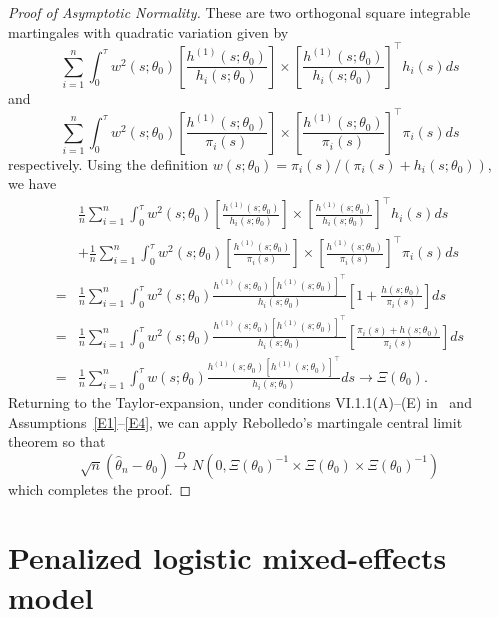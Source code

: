 \documentclass[12pt]{amsart}
\begin{document}
\begin{proof}[Proof of Asymptotic Normality]
These are two orthogonal square integrable martingales with quadratic variation given by
\[
\sum_{i=1}^n \int_0^\tau w^2(s;\theta_0) \left[ \frac{h^{(1)}(s; \theta_0)}{h_i (s;\theta_0)} \right] \times \left[ \frac{h^{(1)} (s;\theta_0)}{h_i (s;\theta_0)} \right]^\top h_i (s) ds
\]
and
\[
\sum_{i=1}^n \int_0^\tau w^2(s;\theta_0) \left[ \frac{h^{(1)}(s; \theta_0)}{\pi_i (s)} \right] \times \left[ \frac{h^{(1)} (s;\theta_0)}{\pi_i (s)} \right]^\top \pi_i (s) ds
\]
respectively.  Using the definition $w(s;\theta_0) = \pi_i(s) / (\pi_i(s)+h_i(s;\theta_0))$, we have
\begin{align*}
&\frac{1}{n} \sum_{i=1}^n \int_0^\tau w^2(s;\theta_0) \left[ \frac{h^{(1)}(s; \theta_0)}{h_i (s;\theta_0)} \right] \times \left[ \frac{h^{(1)} (s;\theta_0)}{h_i (s;\theta_0)} \right]^\top h_i (s) ds \\
&+
\frac{1}{n} \sum_{i=1}^n \int_0^\tau w^2(s;\theta_0) \left[ \frac{h^{(1)}(s; \theta_0)}{\pi_i (s)} \right] \times \left[ \frac{h^{(1)} (s;\theta_0)}{\pi_i (s)} \right]^\top \pi_i (s) ds \\
=& \frac{1}{n} \sum_{i=1}^n \int_0^\tau w^2(s;\theta_0) \frac{h^{(1)}(s; \theta_0) [h^{(1)} (s;\theta_0)]^\top}{h_i (s;\theta_0)} \left[ 1 + \frac{h(s;\theta_0)}{\pi_i (s)} \right] ds \\
=& \frac{1}{n} \sum_{i=1}^n \int_0^\tau w^2(s;\theta_0) \frac{h^{(1)}(s; \theta_0) [h^{(1)} (s;\theta_0)]^\top}{h_i (s;\theta_0)} \left[ \frac{\pi_i (s) + h(s;\theta_0)}{\pi_i (s)} \right] ds \\
=& \frac{1}{n} \sum_{i=1}^n \int_0^\tau w(s;\theta_0) \frac{h^{(1)}(s; \theta_0) [h^{(1)} (s;\theta_0)]^\top}{h_i (s;\theta_0)} ds
\to \Xi (\theta_0).
\end{align*}
Returning to the Taylor-expansion, under conditions VI.1.1(A)--(E) in~\cite{Andersen1993} and Assumptions~\ref{E1}--\ref{E4}, we can apply Rebolledo's martingale central limit theorem so that
$$
\sqrt{n} (\hat \theta_n - \theta_0) \overset{D}{\to} N(0, \Xi(\theta_0) ^{-1} \times \Xi(\theta_0) \times \Xi(\theta_0) ^{-1} )
$$
which completes the proof.
\end{proof}

\section{Penalized logistic mixed-effects model}
\label{app:penlogit}
\end{document}

